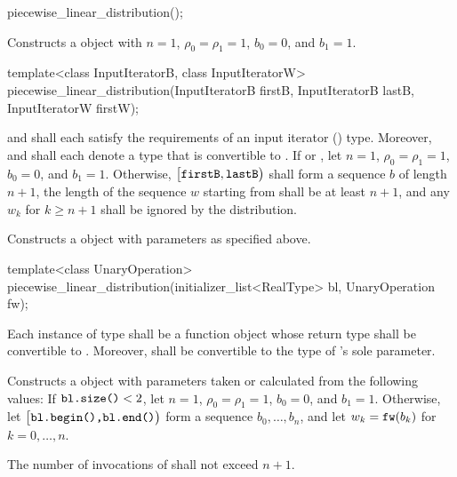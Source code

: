 \begin{itemdecl}
piecewise_linear_distribution();
\end{itemdecl}

\begin{itemdescr}
\pnum\effects Constructs a  object
 with $n = 1$,
 $\rho_0 = \rho_1 = 1$,
 $b_0 = 0$,
 and $b_1 = 1$.
\end{itemdescr}

\begin{itemdecl}
template<class InputIteratorB, class InputIteratorW>
 piecewise_linear_distribution(InputIteratorB firstB, InputIteratorB lastB,
                               InputIteratorW firstW);
\end{itemdecl}

\begin{itemdescr}
\pnum\requires
   and 
  shall each satisfy the requirements
  of an input iterator () type.
  Moreover,
   and
  shall each denote a type that is convertible to .
 If 
 or ,
 let $n = 1$,
     $\rho_0 = \rho_1 = 1$,
     $b_0 = 0$,
 and $b_1 = 1$.
 Otherwise,
 $\bigl[\texttt{firstB}, \texttt{lastB}\bigr)$
 shall form a sequence $b$ of length $n+1$,
 the length of the sequence $w$ starting from 
 shall be at least $n+1$,
 and any $w_k$ for $k \geq n + 1$ shall be ignored by the distribution.

\pnum\effects Constructs a  object
 with parameters as specified above.
\end{itemdescr}


%
\begin{itemdecl}
template<class UnaryOperation>
 piecewise_linear_distribution(initializer_list<RealType> bl, UnaryOperation fw);
\end{itemdecl}

\begin{itemdescr}
\pnum\requires
 Each instance of type 
 shall be a function object
 whose return type shall be convertible to .
 Moreover,
  shall be convertible
 to the type of 's sole parameter.

\pnum\effects Constructs a  object
 with parameters taken or calculated
 from the following values:
 If $\texttt{bl.size()} < 2$,
 let $n = 1$,
     $\rho_0 = \rho_1 = 1$,
     $b_0 = 0$,
 and $b_1 = 1$.
 Otherwise,
 let $\bigl[\texttt{bl.begin(),} \texttt{bl.end()}\bigr)$
 form a sequence $b_0, \dotsc, b_n$,
 and
 let $w_k = \texttt{fw}(b_k)$
 for $k = 0, \dotsc, n$.

\pnum\complexity
 The number of invocations of  shall not exceed $n+1$.
\end{itemdescr}



